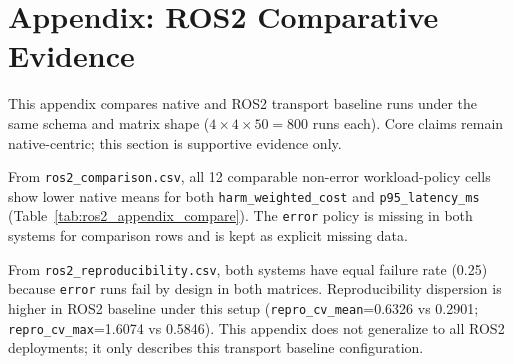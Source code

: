 \section{Appendix: ROS2 Comparative Evidence}


This appendix compares native and ROS2 transport baseline runs under the same schema and matrix shape
(\(4 \times 4 \times 50 = 800\) runs each).
Core claims remain native-centric; this section is supportive evidence only.

From \texttt{ros2\_comparison.csv}, all 12 comparable non-error workload-policy cells show
lower native means for both \texttt{harm\_weighted\_cost} and \texttt{p95\_latency\_ms}
(Table~\ref{tab:ros2_appendix_compare}).
The \texttt{error} policy is missing in both systems for comparison rows and is kept as explicit missing data.

From \texttt{ros2\_reproducibility.csv}, both systems have equal failure rate (0.25) because
\texttt{error} runs fail by design in both matrices.
Reproducibility dispersion is higher in ROS2 baseline under this setup
(\texttt{repro\_cv\_mean}=0.6326 vs 0.2901; \texttt{repro\_cv\_max}=1.6074 vs 0.5846).
This appendix does not generalize to all ROS2 deployments; it only describes this transport baseline configuration.
